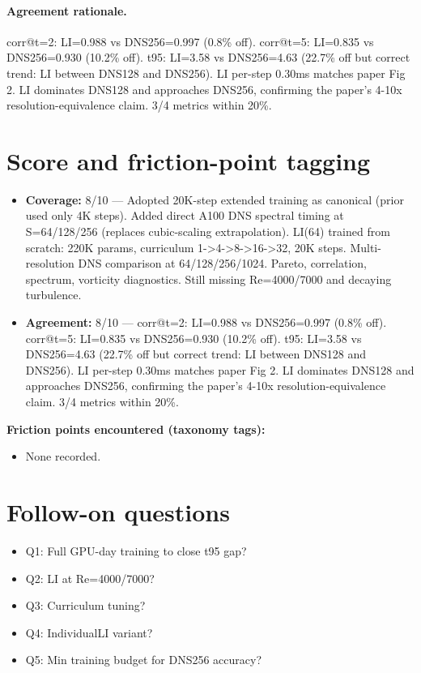 \documentclass[11pt]{article}
\begin{document}
\paragraph{Agreement rationale.} corr@t=2: LI=0.988 vs DNS256=0.997 (0.8\% off). corr@t=5: LI=0.835 vs DNS256=0.930 (10.2\% off). t95: LI=3.58 vs DNS256=4.63 (22.7\% off but correct trend: LI between DNS128 and DNS256). LI per-step 0.30ms matches paper Fig 2. LI dominates DNS128 and approaches DNS256, confirming the paper's 4-10x resolution-equivalence claim. 3/4 metrics within 20\%.

\section{Score and friction-point tagging}\label{sec:friction}
\begin{itemize}
\item \textbf{Coverage:} 8/10 --- Adopted 20K-step extended training as canonical (prior used only 4K steps). Added direct A100 DNS spectral timing at S=64/128/256 (replaces cubic-scaling extrapolation). LI(64) trained from scratch: 220K params, curriculum 1-\textgreater{}4-\textgreater{}8-\textgreater{}16-\textgreater{}32, 20K steps. Multi-resolution DNS comparison at 64/128/256/1024. Pareto, correlation, spectrum, vorticity diagnostics. Still missing Re=4000/7000 and decaying turbulence.
\item \textbf{Agreement:} 8/10 --- corr@t=2: LI=0.988 vs DNS256=0.997 (0.8\% off). corr@t=5: LI=0.835 vs DNS256=0.930 (10.2\% off). t95: LI=3.58 vs DNS256=4.63 (22.7\% off but correct trend: LI between DNS128 and DNS256). LI per-step 0.30ms matches paper Fig 2. LI dominates DNS128 and approaches DNS256, confirming the paper's 4-10x resolution-equivalence claim. 3/4 metrics within 20\%.
\end{itemize}

\noindent\textbf{Friction points encountered (taxonomy tags):}
\begin{itemize}
\item None recorded.
\end{itemize}

\section{Follow-on questions}
\begin{itemize}
\item Q1: Full GPU-day training to close t95 gap?
\item Q2: LI at Re=4000/7000?
\item Q3: Curriculum tuning?
\item Q4: IndividualLI variant?
\item Q5: Min training budget for DNS256 accuracy?
\end{itemize}
\end{document}
